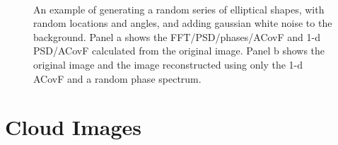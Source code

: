 \documentclass[11pt,preprint]{aastex}
\begin{document}
\begin{figure}[htbp]
\centering
{} \\
\caption{{\small
An example of generating a random series of elliptical shapes, with random locations and angles, and adding gaussian white noise to the background. Panel a shows the FFT/PSD/phases/ACovF and 1-d PSD/ACovF calculated from the original image. Panel b shows the original image and the image reconstructed using only the 1-d ACovF and a random phase spectrum. }}
\label{fig:elliptical}
\end{figure}


\section{Cloud Images}
\end{document}
